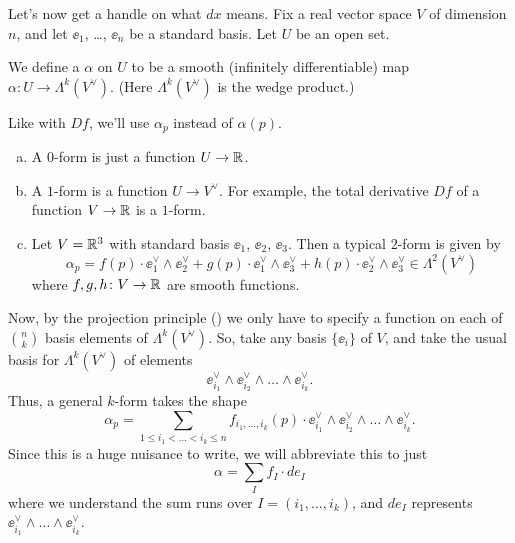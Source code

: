 Let's now get a handle on what $dx$ means.
Fix a real vector space $V$ of dimension $n$,
and let $\ee_1$, \dots, $\ee_n$ be a standard basis.
Let $U$ be an open set.

\begin{definition}
	We define a  $\alpha$ on $U$
	to be a smooth (infinitely differentiable) map
	$\alpha \colon U \to \Lambda^k(V^\vee)$.
	(Here $\Lambda^k(V^\vee)$ is the wedge product.)
\end{definition}

Like with $Df$, we'll use $\alpha_p$ instead of $\alpha(p)$.

\begin{example}
	[$k$-forms for $k=0,1$]
	\listhack
	\begin{enumerate}[(a)]
		\item A $0$-form is just a function $U \to \mathbb R$.
		\item A $1$-form is a function $U \to V^\vee$.
		For example,
		the total derivative $Df$ of a function $V \to \mathbb R$ is a $1$-form.
		\item Let $V = \mathbb R^3$ with standard basis $\ee_1$, $\ee_2$, $\ee_3$.
		Then a typical $2$-form is given by
		\[
			\alpha_p
			=
			f(p) \cdot \ee_1^\vee \wedge \ee_2^\vee
			+ g(p) \cdot \ee_1^\vee \wedge \ee_3^\vee
			+ h(p) \cdot \ee_2^\vee \wedge \ee_3^\vee
			\in \Lambda^2(V^\vee)
		\]
		where $f,g,h \colon V \to \mathbb R$ are smooth functions.
	\end{enumerate}
\end{example}

Now, by the projection principle () we only have to specify
a function on each of $\binom nk$ basis elements of $\Lambda^k(V^\vee)$.
So, take any basis $\{\ee_i\}$ of $V$, and
take the usual basis for $\Lambda^k(V^\vee)$ of elements
\[ \ee_{i_1}^\vee \wedge \ee_{i_2}^\vee \wedge \dots \wedge \ee_{i_k}^\vee. \]
Thus, a general $k$-form takes the shape
\[ \alpha_p = \sum_{1 \le i_1 < \dots < i_k \le n}
	f_{i_1, \dots, i_k}(p) \cdot
	\ee_{i_1}^\vee \wedge \ee_{i_2}^\vee \wedge \dots \wedge \ee_{i_k}^\vee. \]
Since this is a huge nuisance to write, we will abbreviate this to just
\[ \alpha = \sum_I f_I \cdot de_I \]
where we understand the sum runs over $I = (i_1, \dots, i_k)$,
and $de_I$ represents $\ee_{i_1}^\vee \wedge \dots \wedge \ee_{i_k}^\vee$.


